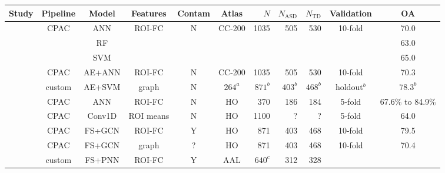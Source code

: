 \documentclass[10pt]{article}
\begin{document}
\begin{table}
  \small
  \centering
  \begin{tabular}{lcccccrrrcc}
    \toprule
    Study                                                         & Pipeline & Model  & Features & Contam &   Atlas  & \(N\) & \(N_\text{ASD}\) & \(N_{\text{TD}}\) & Validation & OA \\
    \midrule
    \citet{heinsfeldIdentificationAutismSpectrum2018}             &   CPAC   &   ANN  &  ROI-FC  &   N    &   CC-200   & 1035  &  505  &  530  &  10-fold   &       70.0       \\
    ~                                                             &          &   RF   &          &        &            &       &       &       &            &       63.0       \\
    ~                                                             &          &   SVM  &          &        &            &       &       &       &            &       65.0       \\ \addlinespace
    \citet{eslamiASDDiagNetHybridLearning2019}                    &   CPAC   & AE+ANN &  ROI-FC  &   N    &   CC-200   & 1035  &  505  &  530  &  10-fold   &       70.3       \\
    \citet{yinDiagnosisAutismSpectrum2021}                        &  custom  & AE+SVM &  graph   &   N    & \(264^a\)  & \(871^b\) & \(403^b\) & \(468^b\)  &  holdout\(^b\) &       \(78.3^b\) \\
    \citet{liMultisiteFMRIAnalysis2020}                           &   CPAC   &  ANN   &  ROI-FC  &   N    &     HO     &  370  &  186  &  184  &   5-fold   & 67.6\% to 84.9\% \\
    \citet{el-gazzarHybrid3DCNN3DCLSTM2019}                       &   CPAC   & Conv1D & ROI means&   N    &     HO     & 1100  &   ?   &   ?   &   5-fold   &       64.0       \\
    \citet{shaoClassificationASDBased2021}                        &   CPAC   & FS+GCN &  ROI-FC  &   Y    &     HO     &  871  &  403  &  468  &  10-fold   &       79.5       \\
    \citet{parisotDiseasePredictionUsing2018}                     &   CPAC   & FS+GCN &  graph   &   ?    &     HO     &  871  &  403  &  468  &  10-fold   &       70.4       \\
    \citet{iidakaRestingStateFunctional2015}                      &  custom  & FS+PNN &  ROI-FC  &   Y    &     AAL   &\(640^c\)& 312  &  328  &            &                  \\

\end{tabular}
\end{table}
\end{document}
